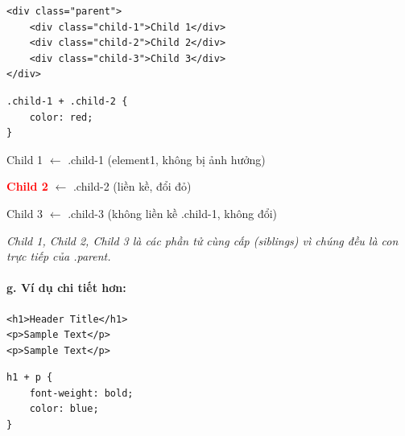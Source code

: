 \begin{codeWindow}
\begin{lstlisting}[language=HTML5]
<div class="parent">
    <div class="child-1">Child 1</div>
    <div class="child-2">Child 2</div>
    <div class="child-3">Child 3</div>
</div>
\end{lstlisting}

\begin{lstlisting}[language=CSS3]
.child-1 + .child-2 {
    color: red;
}
\end{lstlisting}
\end{codeWindow}

\begin{browserWindow}
\sffamily\small
\begin{tcolorbox}[arc=2pt, colback=primaryBlue!5, colframe=primaryBlue!40, boxrule=1pt, title={\sffamily\small\color{white}\textbf{.parent (Phần tử cha)}}, colbacktitle=primaryBlue!70]
\textcolor{darkText}{Child 1} {\small\textcolor{gray!60}{$\leftarrow$ .child-1 (element1, không bị ảnh hưởng)}} \par\vspace{3pt}
\textcolor{red}{\textbf{Child 2}} {\small\textcolor{gray!60}{$\leftarrow$ .child-2 (liền kề, đổi đỏ)}} \par\vspace{3pt}
\textcolor{darkText}{Child 3} {\small\textcolor{gray!60}{$\leftarrow$ .child-3 (không liền kề .child-1, không đổi)}}
\end{tcolorbox}
\textcolor{gray!70}{\small\textit{Child 1, Child 2, Child 3 là các phần tử cùng cấp (siblings) vì chúng đều là con trực tiếp của .parent.}}
\end{browserWindow}

\paragraph{g. Ví dụ chi tiết hơn:}
\begin{codeWindow}
\begin{lstlisting}[language=HTML5]
<h1>Header Title</h1>
<p>Sample Text</p>
<p>Sample Text</p>
\end{lstlisting}

\begin{lstlisting}[language=CSS3]
h1 + p {
    font-weight: bold;
    color: blue;
}
\end{lstlisting}
\end{codeWindow}

